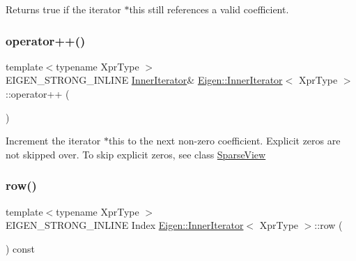 \begin{DoxyReturn}{Returns}
{\ttfamily true} if the iterator {\ttfamily $\ast$this} still references a valid coefficient. 
\end{DoxyReturn}
\mbox{\label{class_eigen_1_1_inner_iterator_ae4ed2eece5291e23d870b7238878e2f1}} 
\subsubsection{\texorpdfstring{operator++()}{operator++()}}
{\footnotesize\ttfamily template$<$typename Xpr\+Type $>$ \\
E\+I\+G\+E\+N\+\_\+\+S\+T\+R\+O\+N\+G\+\_\+\+I\+N\+L\+I\+NE \mbox{\hyperlink{class_eigen_1_1_inner_iterator}{Inner\+Iterator}}\& \mbox{\hyperlink{class_eigen_1_1_inner_iterator}{Eigen\+::\+Inner\+Iterator}}$<$ Xpr\+Type $>$\+::operator++ (\begin{DoxyParamCaption}{ }\end{DoxyParamCaption})\hspace{0.3cm}{\ttfamily [inline]}}

Increment the iterator {\ttfamily $\ast$this} to the next non-\/zero coefficient. Explicit zeros are not skipped over. To skip explicit zeros, see class \mbox{\hyperlink{class_eigen_1_1_sparse_view}{Sparse\+View}} \mbox{\label{class_eigen_1_1_inner_iterator_a3ab6f3afdf62740623cdc9ecb14dc132}} 
\subsubsection{\texorpdfstring{row()}{row()}}
{\footnotesize\ttfamily template$<$typename Xpr\+Type $>$ \\
E\+I\+G\+E\+N\+\_\+\+S\+T\+R\+O\+N\+G\+\_\+\+I\+N\+L\+I\+NE Index \mbox{\hyperlink{class_eigen_1_1_inner_iterator}{Eigen\+::\+Inner\+Iterator}}$<$ Xpr\+Type $>$\+::row (\begin{DoxyParamCaption}{ }\end{DoxyParamCaption}) const\hspace{0.3cm}{\ttfamily [inline]}}

